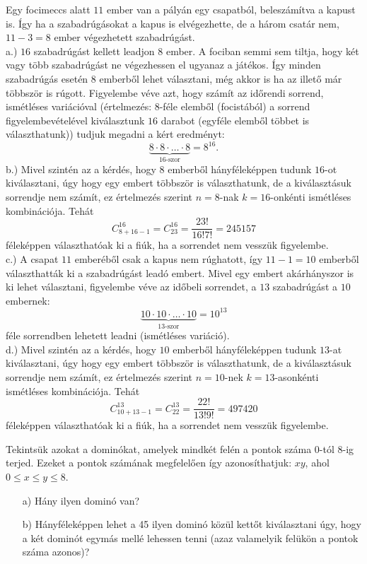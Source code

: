 \begin{solution}
Egy focimeccs alatt $11$ ember van a pályán egy csapatból, beleszámítva
a kapust is. Így ha a szabadrúgásokat a kapus is elvégezhette, de
a három csatár nem, $11-3=8$ ember végezhetett szabadrúgást. \\
 a.) $16$ szabadrúgást kellett leadjon $8$ ember. A fociban semmi
sem tiltja, hogy két vagy több szabadrúgást ne végezhessen el ugyanaz
a játékos. Így minden szabadrúgás esetén $8$ emberből lehet választani,
még akkor is ha az illető már többször is rúgott. Figyelembe véve
azt, hogy számít az időrendi sorrend, ismétléses variációval (értelmezés:
$8$-féle elemből (focistából) a sorrend figyelembevételével kiválasztunk
$16$ darabot (egyféle elemből többet is választhatunk)) tudjuk megadni
a kért eredményt: 
\[
\underbrace{8\cdot8\cdot\ldots\cdot8}_{\text{16-szor}}=8^{16}.
\]
b.) Mivel szintén az a kérdés, hogy $8$ emberből hányféleképpen tudunk
$16$-ot kiválasztani, úgy hogy egy embert többször is választhatunk,
de a kiválasztásuk sorrendje nem számít, ez értelmezés szerint $n=8$-nak
$k=16$-onkénti ismétléses kombinációja. Tehát 
\[
C_{8+16-1}^{16}=C_{23}^{16}=\frac{23!}{16!7!}=245157
\]
féleképpen választhatóak ki a fiúk, ha a sorrendet nem vesszük figyelembe.
\\
 c.) A csapat $11$ emberéből csak a kapus nem rúghatott, így $11-1=10$
emberből választhatták ki a szabadrúgást leadó embert. Mivel egy embert
akárhányszor is ki lehet választani, figyelembe véve az időbeli sorrendet,
a $13$ szabadrúgást a $10$ embernek: 
\[
\underbrace{10\cdot10\cdot\ldots\cdot10}_{\text{13-szor}}=10^{13}
\]
féle sorrendben lehetett leadni (ismétléses variáció).\\
 d.) Mivel szintén az a kérdés, hogy $10$ emberből hányféleképpen
tudunk $13$-at kiválasztani, úgy hogy egy embert többször is választhatunk,
de a kiválasztásuk sorrendje nem számít, ez értelmezés szerint $n=10$-nek
$k=13$-asonkénti ismétléses kombinációja. Tehát 
\[
C_{10+13-1}^{13}=C_{22}^{13}=\frac{22!}{13!9!}=497420
\]
féleképpen választhatóak ki a fiúk, ha a sorrendet nem vesszük figyelembe.
\end{solution}
\begin{extraproblem}
Tekintsük azokat a dominókat, amelyek mindkét felén a pontok száma
0-tól 8-ig terjed. Ezeket a pontok számának megfelelően így azonosíthatjuk:
$xy$, ahol $0\leq x\leq y\leq8$.
\begin{enumerate}
\item[a)] Hány ilyen dominó van? 
\item[b)] Hányféleképpen lehet a 45 ilyen dominó közül kettőt kiválasztani
úgy, hogy a két dominót egymás mellé lehessen tenni (azaz valamelyik
felükön a pontok száma azonos)?
\end{enumerate}
\end{extraproblem}
